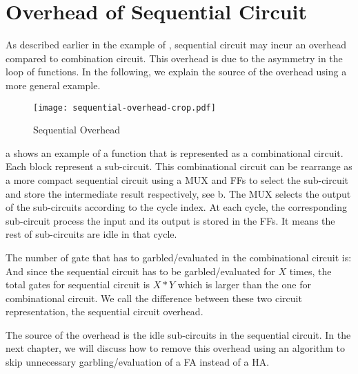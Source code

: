 \section{Overhead of Sequential Circuit}
As described earlier in the example of , sequential circuit may incur an overhead compared to combination circuit.
This overhead is due to the asymmetry in the loop of functions.
In the following, we explain the source of the overhead using a more general example.

\begin{figure}[ht]
    \centering
	\texttt{[image: sequential-overhead-crop.pdf]}
	\caption{Sequential Overhead}\label{fig:sequential-overhead}
\end{figure}

a shows an example of a function that is represented as a combinational circuit.
Each block represent a sub-circuit.
This combinational circuit can be rearrange as a more compact sequential circuit using a MUX and FFs to select the sub-circuit and store the intermediate result respectively, see b.
The MUX selects the output of the sub-circuits according to the cycle index.
At each cycle, the corresponding sub-circuit process the input and its output is stored in the FFs.
It means the rest of sub-circuits are idle in that cycle.

The number of gate that has to garbled/evaluated in the combinational circuit is:
And since the sequential circuit has to be garbled/evaluated for $X$ times, the total gates for sequential circuit is $X*Y$ which is larger than the one for combinational circuit.
We call the difference between these two circuit representation, the sequential circuit overhead.

The source of the overhead is the idle sub-circuits in the sequential circuit.
In the next chapter, we will discuss how to remove this overhead using an algorithm to skip unnecessary garbling/evaluation of a FA instead of a HA.
